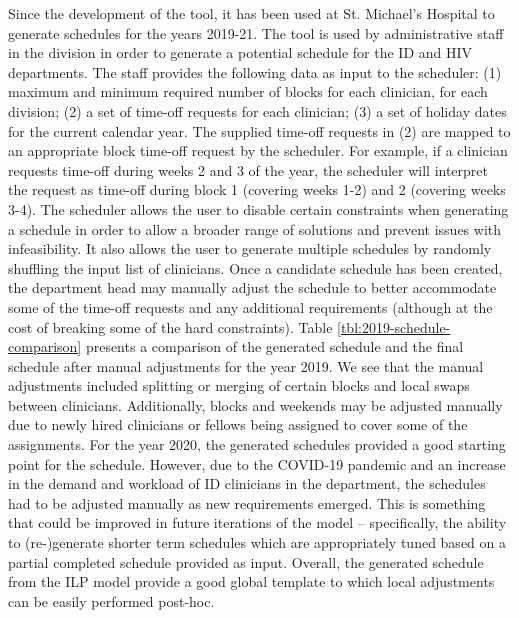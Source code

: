 Since the development of the tool, it has been used at St. Michael's Hospital
to generate schedules for the years 2019-21.
The tool is used by administrative staff in the division in order to generate a potential schedule
for the ID and HIV departments. 
The staff provides the following data as input to the scheduler:
(1) maximum and minimum required number of blocks for each clinician, for each division;
(2) a set of time-off requests for each clinician;
(3) a set of holiday dates for the current calendar year.
The supplied time-off requests in (2) are mapped to an appropriate block time-off request by the scheduler.
For example, if a clinician requests time-off during weeks 2 and 3 of the year, the scheduler
will interpret the request as time-off during block 1 (covering weeks 1-2) and 2 (covering weeks 3-4).
The scheduler allows the user to disable certain constraints when generating a schedule
in order to allow a broader range of solutions and prevent issues with infeasibility. 
It also allows the user to generate multiple schedules by randomly shuffling the input list of clinicians.
Once a candidate schedule has been created, the department head may manually
adjust the schedule to better accommodate some of the time-off requests
and any additional requirements
(although at the cost of breaking some of the hard constraints).
Table \ref{tbl:2019-schedule-comparison} presents a comparison of the generated schedule and the final schedule after manual adjustments
for the year 2019. We see that the manual adjustments included splitting or merging of certain blocks
and local swaps between clinicians.
Additionally, blocks and weekends may be adjusted manually due to newly hired clinicians or fellows being 
assigned to cover some of the assignments.
For the year 2020, the generated schedules provided a good starting point for the schedule.
However, due to the COVID-19 pandemic and an increase in the demand and workload of ID clinicians in the department,
the schedules had to be adjusted manually as new requirements emerged.
This is something that could be improved in future iterations of the model
-- specifically, the ability to (re-)generate shorter term schedules which are appropriately
tuned based on a partial completed schedule provided as input.
Overall, the generated schedule from the ILP model provide a good global template
to which local adjustments can be easily performed post-hoc.


